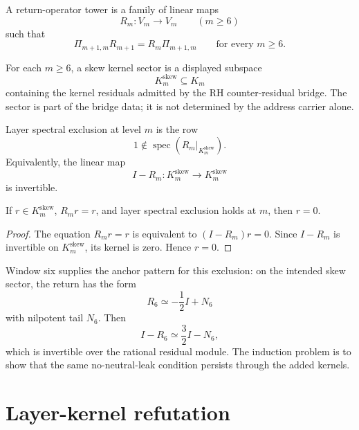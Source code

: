 \begin{definition}
\label{def:axiszeckendorf-compatible-return-operators}
A return-operator tower is a family of linear maps
$$
R_m:V_m\to V_m
\qquad
(m\geq 6)
$$
such that
$$
\Pi_{m+1,m}R_{m+1}=R_m\Pi_{m+1,m}
\qquad
\text{for every }m\geq 6.
$$
\end{definition}

\begin{definition}
\label{def:axiszeckendorf-skew-kernel-sector}
For each $m\geq 6$, a skew kernel sector is a displayed subspace
$$
K_m^{\mathrm{skew}}\subseteq K_m
$$
containing the kernel residuals admitted by the RH counter-residual bridge.
The sector is part of the bridge data; it is not determined by the address
carrier alone.
\end{definition}

\begin{definition}
\label{def:axiszeckendorf-layer-spectral-exclusion}
Layer spectral exclusion at level $m$ is the row
$$
1\notin\operatorname{spec}(R_m|_{K_m^{\mathrm{skew}}}).
$$
Equivalently, the linear map
$$
I-R_m:K_m^{\mathrm{skew}}\to K_m^{\mathrm{skew}}
$$
is invertible.
\end{definition}

\begin{proposition}
\label{prop:axiszeckendorf-no-fixed-skew-residual-excluded-layer}
If $r\in K_m^{\mathrm{skew}}$, $R_mr=r$, and layer spectral exclusion holds
at $m$, then $r=0$.
\end{proposition}

\begin{proof}
The equation $R_mr=r$ is equivalent to $(I-R_m)r=0$.  Since $I-R_m$ is
invertible on $K_m^{\mathrm{skew}}$, its kernel is zero.  Hence $r=0$.
\end{proof}

\begin{remark}
\label{rem:axiszeckendorf-window-six-anchor}
Window six supplies the anchor pattern for this exclusion: on the intended
skew sector, the return has the form
$$
R_6\simeq -\frac{1}{2}I+N_6
$$
with nilpotent tail $N_6$.  Then
$$
I-R_6\simeq\frac{3}{2}I-N_6,
$$
which is invertible over the rational residual module.  The induction
problem is to show that the same no-neutral-leak condition persists through
the added kernels.
\end{remark}

\section{Layer-kernel refutation}
\label{sec:axiszeckendorf-layer-kernel-refutation}

